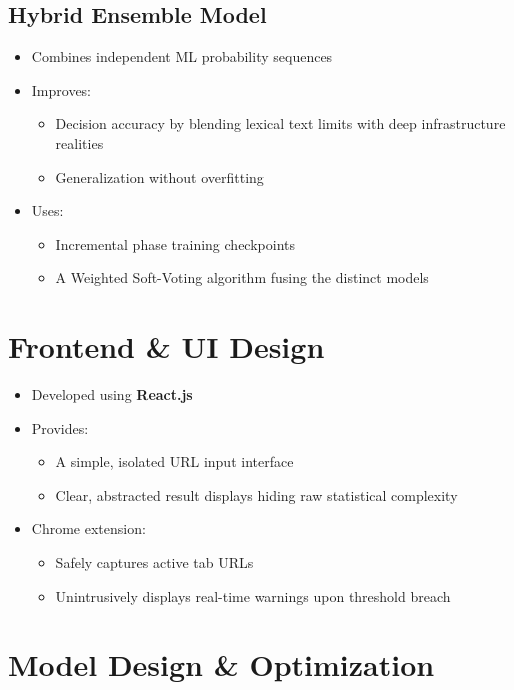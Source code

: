 \subsection{Hybrid Ensemble Model}

\begin{itemize}
    \item Combines independent ML probability sequences
    \item Improves:
    \begin{itemize}
        \item Decision accuracy by blending lexical text limits with deep infrastructure realities
        \item Generalization without overfitting
    \end{itemize}
    \item Uses:
    \begin{itemize}
        \item Incremental phase training checkpoints
        \item A Weighted Soft-Voting algorithm fusing the distinct models
    \end{itemize}
\end{itemize}

\section{Frontend \& UI Design}

\begin{itemize}
    \item Developed using \textbf{React.js}
    \item Provides:
    \begin{itemize}
        \item A simple, isolated URL input interface
        \item Clear, abstracted result displays hiding raw statistical complexity
    \end{itemize}
    \item Chrome extension:
    \begin{itemize}
        \item Safely captures active tab URLs
        \item Unintrusively displays real-time warnings upon threshold breach
    \end{itemize}
\end{itemize}

\section{Model Design \& Optimization}

